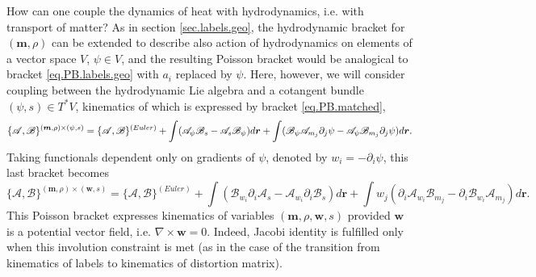 \documentclass[twoside]{article}
\newcommand{\rr}{{\boldsymbol{r}}}
\newcommand{\ww}{{\boldsymbol{w}}}
\newcommand{\mm}{{\boldsymbol{m}}}
\newcommand{\AF}{\mathscr{A}}
\newcommand{\BF}{\mathscr{B}}
\newcommand{\pd}{\partial}
\begin{document}
How can one couple the dynamics of heat with hydrodynamics, i.e. with transport of matter? As in 
section \ref{sec.labels.geo}, the hydrodynamic bracket for $(\mm,\rho)$ can be 
extended to describe also action of hydrodynamics on elements of a vector space 
$V$, $\psi \in V$, and the resulting Poisson bracket would be analogical to 
bracket \eqref{eq.PB.labels.geo} with $a_i$ replaced by $\psi$. Here, however, 
we will consider coupling between the hydrodynamic Lie algebra and a 
cotangent bundle $(\psi, s)\in T^*V$, kinematics of which is expressed by 
bracket \eqref{eq.PB.matched},
\begin{equation}
\{\AF,\BF\}^{(\mm,\rho) \times (\psi,s)} = \{\AF,\BF\}^{(Euler)} + \int 
(\AF_\psi \BF_s - \AF_s \BF_\psi ) d\rr \nonumber\\
+\int (\BF_{\psi} \AF_{m_j} \pd_j \psi - \AF_{\psi} \BF_{m_j} \pd_j \psi) d\rr.
\end{equation}
Taking functionals dependent only on gradients of $\psi$, denoted by $w_i = 
-\pd_i \psi$, this last bracket becomes
\begin{equation}\label{eq.PB.CatHyd.geo}
\{\AF,\BF\}^{(\mm,\rho) \times (\ww,s)} = \{\AF,\BF\}^{(Euler)} + \int 
(\BF_{w_i} \pd_i 
\AF_s - \AF_{w_i} \pd_i \BF_s) d\rr + \int w_j\left(\pd_i \AF_{w_i} \BF_{m_j} - 
\pd_i \BF_{w_i} 
\AF_{m_j}\right) d\rr.
\end{equation}
This Poisson bracket expresses kinematics of variables $(\mm,\rho,\ww,s)$ 
provided $\ww$ is a potential vector field, i.e. $\nabla\times\ww = 0$. Indeed, 
Jacobi identity is fulfilled only when this involution constraint is met (as in 
the case of the transition from kinematics of labels to kinematics of 
distortion matrix). 
\end{document}
